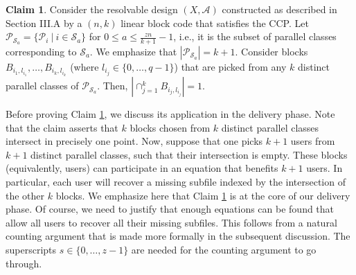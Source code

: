\documentclass[journal,twocolumn]{IEEEtran}
\theoremstyle{definition}
\newtheorem{claim}{Claim}
\newcommand{\calA}{\mathcal{A}}
\newcommand{\calP}{\mathcal{P}}
\newcommand{\calS}{\mathcal{S}}
\newcommand{\aditya}[1]{\marginpar{+}{\bf Aditya's remark}: {\em #1}}
\begin{document}
\begin{claim}
\label{claim:MDSintersection}
	Consider the resolvable design $(X, \calA)$ constructed as described in Section III.A by a $(n,k)$ linear block code that satisfies the CCP. Let $\calP_{\calS_a}=\{\calP_i~|~i\in \calS_a\}$ for $0\le a\le \frac{zn}{k+1}-1$, i.e., it is the subset of parallel classes corresponding to $\calS_a$. We emphasize that $|\calP_{\calS_a}| = k+1$. Consider blocks $B_{i_1, l_{i_1}}, \dots, B_{i_{k}, l_{i_{k}}}$ (where $l_{i_j} \in \{0, \dots, q-1\}$) that are picked from any $k$ distinct parallel classes of $\calP_{\calS_a}$. Then, $|\cap_{j=1}^{k} B_{i_j, l_{i_j}}| = 1$.
\end{claim}
Before proving Claim \ref{claim:MDSintersection}, we discuss its application in the delivery phase. Note that the claim asserts that $k$ blocks chosen from $k$ distinct parallel classes intersect in precisely one point. Now, suppose that one picks $k+1$ users from $k+1$ distinct parallel classes, such that their intersection is empty. These blocks (equivalently, users) can participate in an equation that benefits $k+1$ users. In particular, each user will recover a missing subfile indexed by the intersection of the other $k$ blocks. We emphasize here that Claim \ref{claim:MDSintersection} is at the core of our delivery phase. Of course, we need to justify that enough equations can be found that allow all users to recover all their missing subfiles. This follows from a natural counting argument that is made more formally in the subsequent discussion. The superscripts $s \in \{0, \dots, z-1\}$ are needed for the counting argument to go through.
\end{document}
